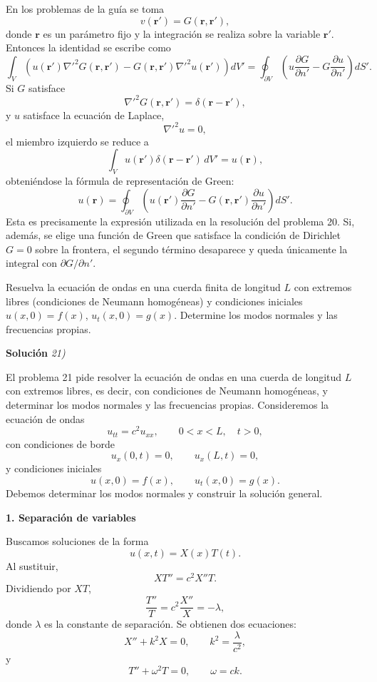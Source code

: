 \documentclass[11pt,spanish]{article}
\newcounter{problema}
\newcommand{\prob}{\stepcounter{problema} \vspace{.5cm} \noindent{\bf Problema \arabic{problema}: }}
\begin{document}
En los problemas de la guía se toma
$$
v(\mathbf r')=G(\mathbf r,\mathbf r'),
$$
donde $\mathbf r$ es un parámetro fijo y la integración se realiza sobre la variable $\mathbf r'$.
Entonces la identidad se escribe como
$$
\boxed{
\int_V
\left(
u(\mathbf r')
\nabla'^2G(\mathbf r,\mathbf r')
-
G(\mathbf r,\mathbf r')
\nabla'^2u(\mathbf r')
\right)
dV'
=
\oint_{\partial V}
\left(
u\frac{\partial G}{\partial n'}
-
G\frac{\partial u}{\partial n'}
\right)
dS'.
}
$$
Si $G$ satisface
$$
\nabla'^2G(\mathbf r,\mathbf r')
=
\delta(\mathbf r-\mathbf r'),
$$
y $u$ satisface la ecuación de Laplace,
$$
\nabla'^2u=0,
$$
el miembro izquierdo se reduce a
$$
\int_V
u(\mathbf r')
\delta(\mathbf r-\mathbf r')
\,dV'
=
u(\mathbf r),
$$
obteniéndose la fórmula de representación de Green:
$$
\boxed{
u(\mathbf r)
=
\oint_{\partial V}
\left(
u(\mathbf r')
\frac{\partial G}{\partial n'}
-
G(\mathbf r,\mathbf r')
\frac{\partial u}{\partial n'}
\right)
dS'.
}
$$
Esta es precisamente la expresión utilizada en la resolución del problema 20. 
Si, además, se elige una función de Green que satisface la condición de Dirichlet $G=0$ sobre la frontera, el segundo término desaparece y queda únicamente la integral con $\partial G/\partial n'$.










\prob Resuelva la ecuación de ondas en una cuerda finita de longitud \(L\) con extremos libres (condiciones de Neumann homogéneas) y condiciones iniciales \(u(x,0)=f(x)\), \(u_t(x,0)=g(x)\). Determine los modos normales y las frecuencias propias.

\vspace{0.5cm}
{\bf Soluci\'on }{\em 21)}
\vspace{0.5cm} 

El problema 21 pide resolver la ecuación de ondas en una cuerda de longitud $L$ con extremos libres, es decir, con condiciones de Neumann homogéneas, y determinar los modos normales y las frecuencias propias. 
Consideremos la ecuación de ondas
$$
u_{tt}=c^2u_{xx},
\qquad 0<x<L,\quad t>0,
$$
con condiciones de borde
$$
u_x(0,t)=0,\qquad
u_x(L,t)=0,
$$
y condiciones iniciales
$$
u(x,0)=f(x),\qquad
u_t(x,0)=g(x).
$$
Debemos determinar los modos normales y construir la solución general.

{\bf 1. Separación de variables}

Buscamos soluciones de la forma
$$
u(x,t)=X(x)T(t).
$$
Al sustituir,
$$
XT''=c^2X''T.
$$
Dividiendo por $XT$,
$$
\frac{T''}{T}
=
c^2\frac{X''}{X}
=
-\lambda,
$$
donde $\lambda$ es la constante de separación.
Se obtienen dos ecuaciones:
$$
X''+k^2X=0,
\qquad
k^2=\frac{\lambda}{c^2},
$$
y
$$
T''+\omega^2T=0,
\qquad
\omega=ck.
$$
\end{document}
